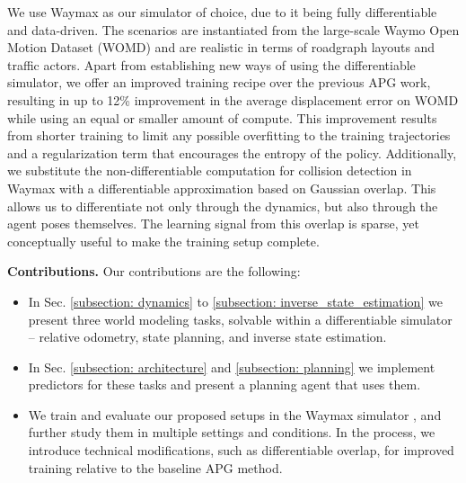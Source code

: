We use Waymax \cite{gulino2024waymax} as our simulator of choice, due to it being fully differentiable and data-driven. The scenarios are instantiated from the large-scale Waymo Open Motion Dataset (WOMD) \cite{ettinger2021large} and are realistic in terms of roadgraph layouts and traffic actors. Apart from establishing new ways of using the differentiable simulator, we offer an improved training recipe over the previous APG work, resulting in up to 12\% improvement in the average displacement error on WOMD while using an equal or smaller amount of compute. This improvement results from shorter training to limit any possible overfitting to the training trajectories and a regularization term that encourages the entropy of the policy. Additionally, we substitute the non-differentiable computation for collision detection in Waymax with a differentiable approximation based on Gaussian overlap. This allows us to differentiate not only through the dynamics, but also through the agent poses themselves. The learning signal from this overlap is sparse, yet conceptually useful to make the training setup complete. 

\textbf{Contributions.} Our contributions are the following:
\begin{itemize}
    \item In Sec. \ref{subsection: dynamics} to \ref{subsection: inverse_state_estimation} we present three world modeling tasks, solvable within a differentiable simulator -- relative odometry, state planning, and inverse state estimation.
    \item In Sec. \ref{subsection: architecture} and \ref{subsection: planning} we implement predictors for these tasks and present a planning agent that uses them.
    \item We train and evaluate our proposed setups in the Waymax simulator \cite{gulino2024waymax}, and further study them in multiple settings and conditions. In the process, we introduce technical modifications, such as differentiable overlap, for improved training relative to the baseline APG method.
\end{itemize}